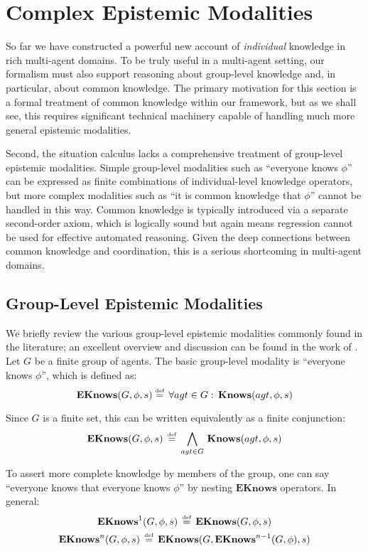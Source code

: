 

\chapter{Complex Epistemic Modalities}

\label{ch:cknowledge}

So far we have constructed a powerful new account of \emph{individual}
knowledge in rich multi-agent domains. To be truly useful in a multi-agent
setting, our formalism must also support reasoning about group-level
knowledge and, in particular, about common knowledge. The primary
motivation for this section is a formal treatment of common knowledge
within our framework, but as we shall see, this requires significant
technical machinery capable of handling much more general epistemic
modalities.

Second, the situation calculus lacks a comprehensive treatment of
group-level epistemic modalities. Simple group-level modalities such
as {}``everyone knows $\phi$'' can be expressed as finite combinations
of individual-level knowledge operators, but more complex modalities
such as {}``it is common knowledge that $\phi$'' cannot be handled
in this way. Common knowledge is typically introduced via a separate
second-order axiom, which is logically sound but again means regression
cannot be used for effective automated reasoning. Given the deep connections
between common knowledge and coordination, this is a serious shortcoming
in multi-agent domains.


\section{Group-Level Epistemic Modalities}

We briefly review the various group-level epistemic modalities commonly
found in the literature; an excellent overview and discussion can
be found in the work of \citet{halpern90knowledge_distrib}. Let $G$
be a finite group of agents. The basic group-level modality is {}``everyone
knows $\phi$'', which is defined as:\[
\mathbf{EKnows}(G,\phi,s)\stackrel{\mbox{\tiny def}}{=}\,\forall agt\in G:\,\mathbf{Knows}(agt,\phi,s)\]


Since $G$ is a finite set, this can be written equivalently as a
finite conjunction:\[
\mathbf{EKnows}(G,\phi,s)\,\stackrel{\mbox{\tiny def}}{=}\,\bigwedge_{agt\in G}\,\mathbf{Knows}(agt,\phi,s)\]


To assert more complete knowledge by members of the group, one can
say {}``everyone knows that everyone knows $\phi$'' by nesting
$\mathbf{EKnows}$ operators. In general:\begin{gather*}
\mathbf{EKnows}^{1}(G,\phi,s)\,\stackrel{\mbox{\tiny def}}{=}\,\mathbf{EKnows}(G,\phi,s)\\
\mathbf{EKnows}^{n}(G,\phi,s)\,\stackrel{\mbox{\tiny def}}{=}\,\mathbf{EKnows}(G,\mathbf{EKnows}^{n-1}(G,\phi),s)\end{gather*}


